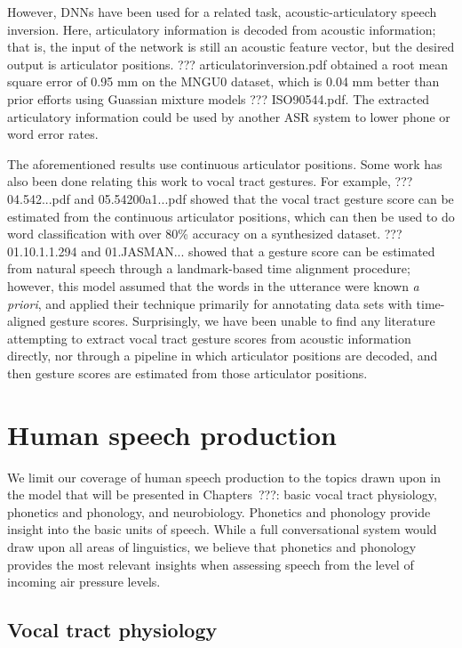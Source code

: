 However, DNNs have been used for
a related task,
acoustic-articulatory speech inversion.
Here, articulatory information
is decoded from acoustic information;
that is, the input of the network
is still an acoustic feature vector,
but the desired output
is articulator positions.
??? articulatorinversion.pdf
obtained a root mean square error
of 0.95 mm on the MNGU0 dataset,
which is 0.04 mm better than prior
efforts using Guassian mixture models
??? ISO90544.pdf.
The extracted articulatory information
could be used by another ASR system
to lower phone or word error rates.

The aforementioned results
use continuous articulator positions.
Some work has also been done
relating this work to
vocal tract gestures.
For example,
??? 04.542...pdf and 05.54200a1...pdf
showed that the vocal tract gesture score
can be estimated
from the continuous articulator positions,
which can then be used
to do word classification with
over 80\% accuracy on a synthesized dataset.
??? 01.10.1.1.294 and 01.JASMAN...
showed that a gesture score
can be estimated from natural speech
through a landmark-based time alignment procedure;
however, this model assumed that the
words in the utterance were known \textit{a priori},
and applied their technique primarily
for annotating data sets with time-aligned gesture scores.
Surprisingly, we have been unable to find any literature
attempting to extract vocal tract gesture scores
from acoustic information directly,
nor through a pipeline in which
articulator positions are decoded,
and then gesture scores are estimated
from those articulator positions.

\section{Human speech production}

We limit our coverage
of human speech production
to the topics drawn upon
in the model that will be presented
in Chapters~???:
basic vocal tract physiology,
phonetics and phonology,
and neurobiology.
Phonetics and phonology
provide insight into the basic units of speech.
While a full conversational system
would draw upon all areas of linguistics,
we believe that phonetics and phonology
provides the most relevant insights
when assessing speech from the level of
incoming air pressure levels.

\subsection{Vocal tract physiology}

